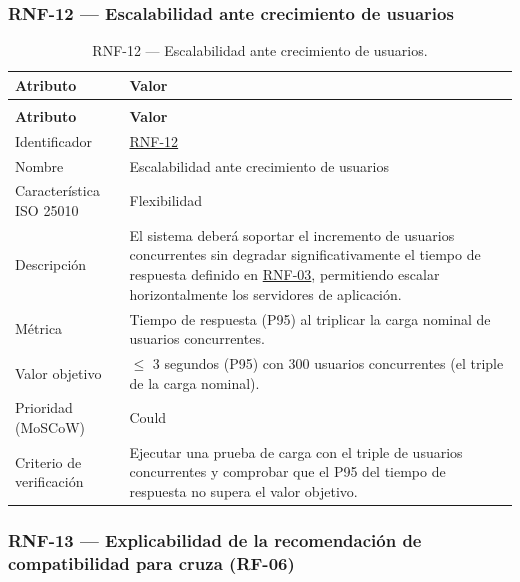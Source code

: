 \documentclass[journal,onecolumn]{IEEEtran}
\makeatletter
\newenvironment{atributos}[2]{%
	\small
	\begin{longtable}{@{}>{\raggedright\arraybackslash}p{4.2cm} >{\raggedright\arraybackslash}p{11.2cm}@{}}
		\caption{#2}\label{tab:#1}\\
		\toprule
		\textbf{Atributo} & \textbf{Valor} \\
		\midrule
		\endfirsthead
		\multicolumn{2}{@{}l}{\small\itshape (continuación)}\\
		\toprule
		\textbf{Atributo} & \textbf{Valor} \\
		\midrule
		\endhead
		\bottomrule
		\endlastfoot
	}{%
	\end{longtable}
	\normalsize
}
\makeatother
\begin{document}
	\subsubsection{RNF-12 --- Escalabilidad ante crecimiento de usuarios}
	
	\begin{atributos}{RNF-12}{RNF-12 --- Escalabilidad ante crecimiento de usuarios.}
		Identificador & \hyperref[tab:RNF-12]{RNF-12} \\
		Nombre & Escalabilidad ante crecimiento de usuarios \\
		Característica ISO 25010 & Flexibilidad \\
		Descripción & El sistema deberá soportar el incremento de usuarios concurrentes sin degradar significativamente el tiempo de respuesta definido en \hyperref[tab:RNF-03]{RNF-03}, permitiendo escalar horizontalmente los servidores de aplicación. \\
		Métrica & Tiempo de respuesta (P95) al triplicar la carga nominal de usuarios concurrentes. \\
		Valor objetivo & $\leq$ 3 segundos (P95) con 300 usuarios concurrentes (el triple de la carga nominal). \\
		Prioridad (MoSCoW) & Could \\
		Criterio de verificación & Ejecutar una prueba de carga con el triple de usuarios concurrentes y comprobar que el P95 del tiempo de respuesta no supera el valor objetivo. \\
	\end{atributos}
	
	\subsubsection{RNF-13 --- Explicabilidad de la recomendación de compatibilidad para cruza (RF-06)}
	
\end{document}
